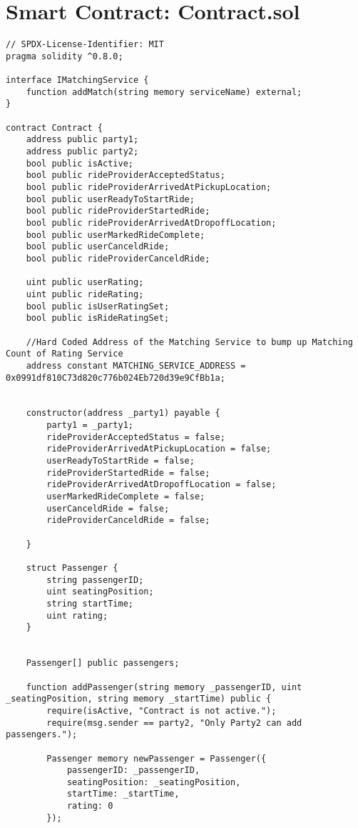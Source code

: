 \section{Smart Contract: Contract.sol}
\begin{lstlisting}
// SPDX-License-Identifier: MIT
pragma solidity ^0.8.0;

interface IMatchingService {
    function addMatch(string memory serviceName) external;
}

contract Contract {
    address public party1;
    address public party2;
    bool public isActive;
    bool public rideProviderAcceptedStatus;
    bool public rideProviderArrivedAtPickupLocation;
    bool public userReadyToStartRide;
    bool public rideProviderStartedRide;
    bool public rideProviderArrivedAtDropoffLocation;
    bool public userMarkedRideComplete;
    bool public userCanceldRide;
    bool public rideProviderCanceldRide;

    uint public userRating;
    uint public rideRating;
    bool public isUserRatingSet;
    bool public isRideRatingSet;

    //Hard Coded Address of the Matching Service to bump up Matching Count of Rating Service
    address constant MATCHING_SERVICE_ADDRESS = 0x0991df810C73d820c776b024Eb720d39e9CfBb1a;


    constructor(address _party1) payable {
        party1 = _party1;
        rideProviderAcceptedStatus = false;
        rideProviderArrivedAtPickupLocation = false;
        userReadyToStartRide = false;
        rideProviderStartedRide = false;
        rideProviderArrivedAtDropoffLocation = false;
        userMarkedRideComplete = false;
        userCanceldRide = false;
        rideProviderCanceldRide = false;

    }

    struct Passenger {
        string passengerID;
        uint seatingPosition;
        string startTime;
        uint rating;
    }


    Passenger[] public passengers;

    function addPassenger(string memory _passengerID, uint _seatingPosition, string memory _startTime) public {
        require(isActive, "Contract is not active.");
        require(msg.sender == party2, "Only Party2 can add passengers.");

        Passenger memory newPassenger = Passenger({
            passengerID: _passengerID,
            seatingPosition: _seatingPosition,
            startTime: _startTime,
            rating: 0
        });


\end{lstlisting}
